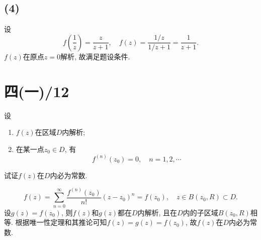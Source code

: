 \documentclass[11pt,a4paper]{article}
\begin{document}
\subsection*{(4)}
设
$$f\left(\frac{1}{z}\right)=\dfrac{z}{z+1},\quad f(z)=\frac{1/z}{1/z+1}=\frac{1}{z+1}.$$
$f(z)$在原点$z=0$解析, 故满足题设条件.

\section{四(一)/12}
\begin{problem}
设
\begin{enumerate}
  \item $f(z)$在区域$D$内解析;
  \item 在某一点$z_0\in D$, 有$$f^{(n)}(z_0)=0,\quad n=1,2,\cdots$$
\end{enumerate}
试证$f(z)$在$D$内必为常数.
\end{problem}

$$f(z)=\sum_{n=0}^\infty\frac{f^{(n)}(z_0)}{n!}(z-z_0)^n=f(z_0),\quad z\in B(z_0,R)\subset D.$$
设$g(z)=f(z_0)$, 则$f(z)$和$g(z)$都在$D$内解析, 且在$D$内的子区域$B(z_0,R)$相等. 根据唯一性定理和其推论可知$f(z)=g(z)=f(z_0)$, 故$f(z)$在$D$内必为常数.
\end{document}
